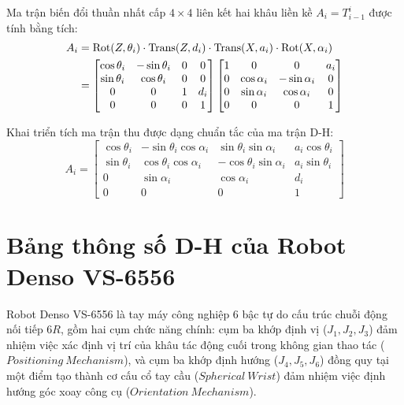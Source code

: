 Ma trận biến đổi thuần nhất cấp $4 \times 4$ liên kết hai khâu liền kề $A_i = T_{i-1}^i$ được tính bằng tích:
\begin{align}
    A_i &= \text{Rot}(Z, \theta_i) \cdot \text{Trans}(Z, d_i) \cdot \text{Trans}(X, a_i) \cdot \text{Rot}(X, \alpha_i) \notag \\
        &= \begin{bmatrix}
            \cos\theta_i & -\sin\theta_i & 0 & 0 \\
            \sin\theta_i &  \cos\theta_i & 0 & 0 \\
            0 & 0 & 1 & d_i \\
            0 & 0 & 0 & 1
        \end{bmatrix}
        \begin{bmatrix}
            1 & 0 & 0 & a_i \\
            0 & \cos\alpha_i & -\sin\alpha_i & 0 \\
            0 & \sin\alpha_i &  \cos\alpha_i & 0 \\
            0 & 0 & 0 & 1
        \end{bmatrix}
\end{align}

Khai triển tích ma trận thu được dạng chuẩn tắc của ma trận D-H:
\begin{equation}
    A_i = \begin{bmatrix}
        \cos\theta_i & -\sin\theta_i\cos\alpha_i &  \sin\theta_i\sin\alpha_i & a_i\cos\theta_i \\
        \sin\theta_i &  \cos\theta_i\cos\alpha_i & -\cos\theta_i\sin\alpha_i & a_i\sin\theta_i \\
        0            &  \sin\alpha_i             &  \cos\alpha_i             & d_i             \\
        0            &  0                        &  0                        & 1
    \end{bmatrix}
    \label{eq:standard_dh_matrix}
\end{equation}

\section{Bảng thông số D-H của Robot Denso VS-6556}
\label{sec:denso_dh_table}

Robot Denso VS-6556 là tay máy công nghiệp 6 bậc tự do cấu trúc chuỗi động nối tiếp $6R$, gồm hai cụm chức năng chính: cụm ba khớp định vị ($J_1, J_2, J_3$) đảm nhiệm việc xác định vị trí của khâu tác động cuối trong không gian thao tác ($Positioning\ Mechanism$), và cụm ba khớp định hướng ($J_4, J_5, J_6$) đồng quy tại một điểm tạo thành cơ cấu cổ tay cầu ($Spherical\ Wrist$) đảm nhiệm việc định hướng góc xoay công cụ ($Orientation\ Mechanism$).

